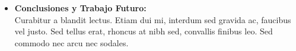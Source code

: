 \begin{itemize}
\item \textbf{Conclusiones y Trabajo Futuro:}\\
Curabitur a blandit lectus. Etiam dui mi, interdum sed gravida ac, faucibus vel justo. Sed tellus erat, rhoncus at nibh sed, convallis finibus leo. Sed commodo nec arcu nec sodales. 
\end{itemize}


\afterpage{\blankpage}


